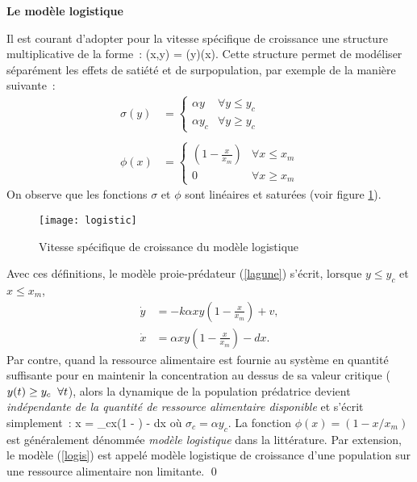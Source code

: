 \begin{exemple}{\bf Le modèle logistique}

Il est courant d'adopter pour la vitesse spécifique de croissance une
structure multiplicative de la forme~:
\eqnn
\mu(x,y) = \sigma(y)\phi(x).
\eeqnn
Cette structure permet de modéliser séparément les effets de satiété et
de surpopulation, par exemple de la manière suivante~:
\begin{equation*} \begin{split} \sigma(y) &= \left\{\begin{array}{ll}
\alpha y & \forall y \leq y_{c} \\ \alpha y_{c} & \forall y \geq y_{c} \end{array} \right.\\ \\
\phi(x) &= 
\left\{ \begin{array}{ll} (1 - \frac{x}{x_{m}}) & \forall x \leq x_{m} \\ 0  & \forall x \geq x_{m}
\end{array} \right.
\end{split} \end{equation*}
On observe que les fonctions $\sigma$ et $\phi$ sont linéaires et
saturées (voir figure  \ref{Fig:logistic}).
\begin{figure}[htbp] 
   \centering
   \texttt{[image: logistic]} 
   \caption{Vitesse spécifique de croissance du modèle logistique}
   \label{Fig:logistic}
\end{figure}
Avec ces définitions, le modèle proie-prédateur
(\ref{lagune}) s'écrit, lorsque $y \leq y_{c}$ et $x \leq x_{m}$,
\begin{equation*} \begin{split}
\dot y &= -k\alpha xy(1 - \frac{x}{x_{m}}) + v, \\
\dot x &= \alpha xy(1 - \frac{x}{x_{m}}) - dx.
\end{split} \end{equation*}
Par contre, quand la ressource alimentaire est fournie au système en
quantité suffisante pour en maintenir la concentration au dessus de sa
valeur critique ($y(t) \geq y_{c} \hspace{2mm} \forall t$), alors la dynamique de
la population prédatrice devient {\em indépendante de la quantité de
ressource alimentaire disponible} et s'écrit simplement~:
\eqn
\dot x = \sigma_{c}x(1 - ) - dx  \label{logis}
\eeqn
où $\sigma_c = \alpha y_c$. La fonction $\phi(x) = (1 - x/x_{m})$ est généralement
dénommée {\em modèle logistique} dans la littérature. Par extension, le
modèle (\ref{logis}) est appelé modèle logistique de croissance d'une
population sur une ressource alimentaire non limitante.   \qed
\end{exemple}

